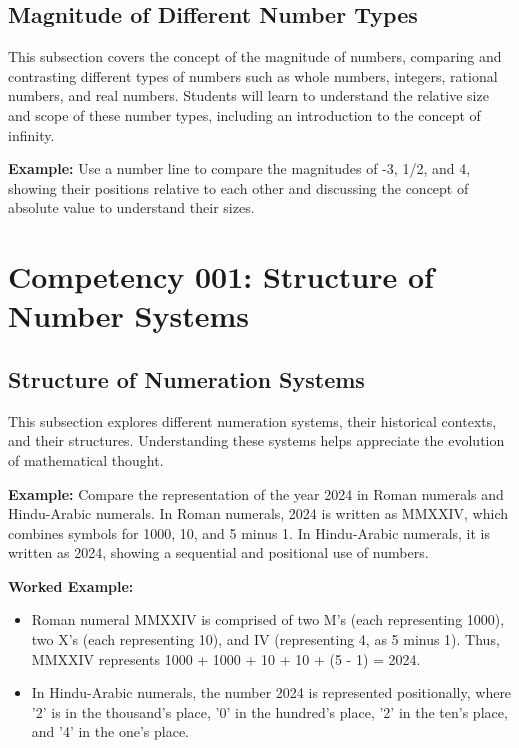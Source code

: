 \documentclass{book}
\begin{document}
\subsection{Magnitude of Different Number Types}
This subsection covers the concept of the magnitude of numbers, comparing and contrasting different types of numbers such as whole numbers, integers, rational numbers, and real numbers. Students will learn to understand the relative size and scope of these number types, including an introduction to the concept of infinity.


\textbf{Example:} Use a number line to compare the magnitudes of -3, 1/2, and 4, showing their positions relative to each other and discussing the concept of absolute value to understand their sizes.

\section{Competency 001: Structure of Number Systems}
\subsection{Structure of Numeration Systems}
This subsection explores different numeration systems, their historical contexts, and their structures. Understanding these systems helps appreciate the evolution of mathematical thought.


\textbf{Example:} Compare the representation of the year 2024 in Roman numerals and Hindu-Arabic numerals. In Roman numerals, 2024 is written as MMXXIV, which combines symbols for 1000, 10, and 5 minus 1. In Hindu-Arabic numerals, it is written as 2024, showing a sequential and positional use of numbers.

\textbf{Worked Example:}
\begin{itemize}
    \item Roman numeral MMXXIV is comprised of two M's (each representing 1000), two X's (each representing 10), and IV (representing 4, as 5 minus 1). Thus, MMXXIV represents 1000 + 1000 + 10 + 10 + (5 - 1) = 2024.
    \item In Hindu-Arabic numerals, the number 2024 is represented positionally, where '2' is in the thousand's place, '0' in the hundred's place, '2' in the ten's place, and '4' in the one's place.
\end{itemize}
\end{document}
